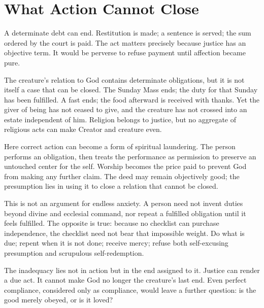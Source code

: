 \section{What Action Cannot Close}

A determinate debt can end. Restitution is made; a sentence is served; the sum ordered by the court is paid. The act matters precisely because justice has an objective term. It would be perverse to refuse payment until affection became pure.

The creature's relation to God contains determinate obligations, but it is not itself a case that can be closed. The Sunday Mass ends; the duty for that Sunday has been fulfilled. A fast ends; the food afterward is received with thanks. Yet the giver of being has not ceased to give, and the creature has not crossed into an estate independent of him. Religion belongs to justice, but no aggregate of religious acts can make Creator and creature even.

Here correct action can become a form of spiritual laundering. The person performs an obligation, then treats the performance as permission to preserve an untouched center for the self. Worship becomes the price paid to prevent God from making any further claim. The deed may remain objectively good; the presumption lies in using it to close a relation that cannot be closed.

This is not an argument for endless anxiety. A person need not invent duties beyond divine and ecclesial command, nor repeat a fulfilled obligation until it feels fulfilled. The opposite is true: because no checklist can purchase independence, the checklist need not bear that impossible weight. Do what is due; repent when it is not done; receive mercy; refuse both self-excusing presumption and scrupulous self-redemption.

The inadequacy lies not in action but in the end assigned to it. Justice can render a due act. It cannot make God no longer the creature's last end. Even perfect compliance, considered only as compliance, would leave a further question: is the good merely obeyed, or is it loved?
